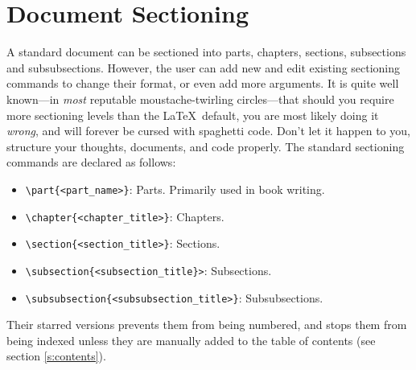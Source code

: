 \section{Document Sectioning}
%
A standard document can be sectioned into parts, chapters, sections, subsections and subsubsections. However, the user can add new and edit existing sectioning commands to change their format, or even add more arguments. It is quite well known---in \emph{most} reputable moustache-twirling circles---that should you require more sectioning levels than the \LaTeX~default, you are most likely doing it \emph{wrong}, and will forever be cursed with spaghetti code. Don't let it happen to you, structure your thoughts, documents, and code properly. The standard sectioning commands are declared as follows:
\begin{itemize}
	\item \verb|\part{<part_name>}|: Parts. Primarily used in book writing.
	\item \verb|\chapter{<chapter_title>}|: Chapters.
	\item \verb|\section{<section_title>}|: Sections.
	\item \verb|\subsection{<subsection_title}>|: Subsections.
	\item \verb|\subsubsection{<subsubsection_title>}|: Subsubsections.
\end{itemize}
Their starred versions prevents them from being numbered, and stops them from being indexed unless they are manually added to the table of contents (see section \ref{s:contents}).
%
